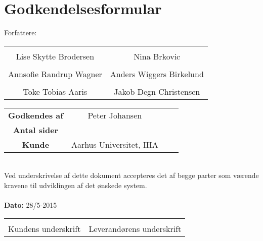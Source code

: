 \chapter{Godkendelsesformular}

{\large Forfattere:}
\\[5ex]


\begin{tabular}{c c}
\centering 
	\makebox[2.0in]{\hrulefill} & \makebox[2.0in]{\hrulefill}\\
	Lise Skytte Brodersen & Nina Brkovic\\[7ex]
	\makebox[2.0in]{\hrulefill} & \makebox[2.0in]{\hrulefill}\\
	Annsofie Randrup Wagner & Anders Wiggers Birkelund \\[7ex]
	\makebox[2.0in]{\hrulefill} & \makebox[2.0in]{\hrulefill}\\
	Toke Tobias Aaris & Jakob Degn Christensen\\[7ex]

\end{tabular}

\begin{tabular}{c c c c}
	\textbf{Godkendes af} & Peter Johansen\\[3ex]
	\textbf{Antal sider} & \pageref{LastPage} \\[3ex]
	\textbf{Kunde} & Aarhus Universitet, IHA
\end{tabular}\\[8ex]
Ved underskrivelse af dette dokument accepteres det af begge parter som værende kravene til udviklingen af det ønskede system.
\\
\\
\textbf{Dato: } 28/5-2015\\[7ex]

\begin{tabular}{c c}
	\makebox[2.0in]{\hrulefill} & \makebox[2.0in]{\hrulefill}\\
	\centering 
	Kundens underskrift & Leverandørens underskrift
\end{tabular}
